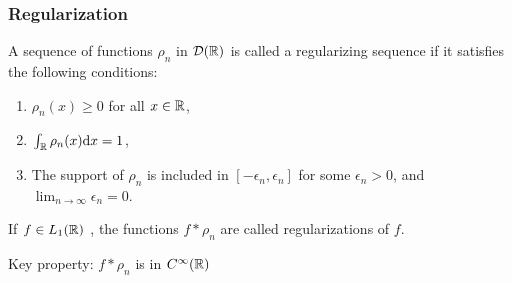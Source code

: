 

\begin{frame}
\frametitle{Regularization}
\begin{definition}
A sequence of functions $\rho_{n}$ in $\mathcal{D}(\mathbb{R})$  is called a regularizing sequence if it satisfies the following conditions:
\begin{enumerate}[label=(\roman*)]
\item $\rho_{n}(x)\geq 0$ for all $ x\in \mathbb{R}$,
\item $\int_{\mathbb{R}}\rho_{n}(x) \mathrm{d} x=1$,
\item The support of $\rho_{n}$ is included in $[-\epsilon_{n},\epsilon_{n}]$ for some $\epsilon_{n}>0$, and $\lim_{n\rightarrow\infty}\epsilon_{n}=0$.
\end{enumerate}
\end{definition}
\begin{definition}
If $ f\in L_1(\mathbb{R})$ , the functions $f*\rho_{n}$ are called \alert{regularizations} of $f$.
\end{definition}
\alert{Key property:} $f*\rho_{n}$ is in $C^{\infty}(\mathbb{R})$
\end{frame}

